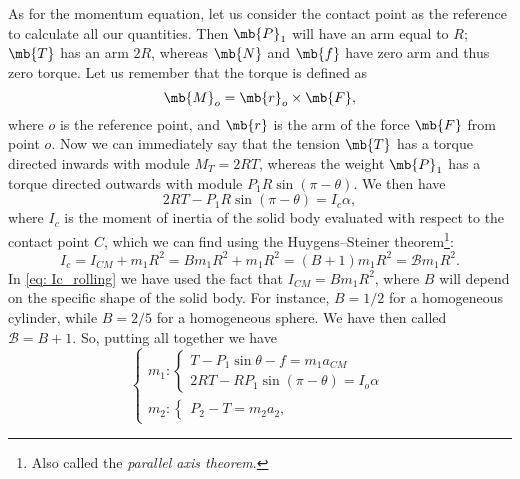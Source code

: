 \begin{description}
\begin{enumerate}[(a)]
        As for the momentum equation, let us consider the contact point as the reference to calculate all our quantities. Then $\mb{P}_1$ will have an arm equal to $R$; $\mb{T}$ has an arm $2R$, whereas $\mb{N}$ and $\mb{f}$ have zero arm and thus zero torque. Let us remember that the torque is defined as
        \begin{equation}
            \mb{M}_o = \mb{r}_o \times \mb{F},    
        \end{equation} 
        where $o$ is the reference point, and $\mb{r}$ is the arm of the force $\mb{F}$ from point $o$. Now we can immediately say that the tension $\mb{T}$ has a torque directed inwards with module $M_T = 2RT$, whereas the weight $\mb{P}_1$ has a torque directed outwards with module $P_1 R \sin (\pi - \theta)$.
        We then have
        \begin{equation}
            2RT - P_1 R \sin(\pi - \theta) = I_c \alpha,
        \end{equation}
        where $I_c$ is the moment of inertia of the solid body evaluated with respect to the contact point $C$, which we can find using the Huygens--Steiner theorem\footnote{Also called the \emph{parallel axis theorem}.}:
        \begin{equation}
            \label{eq: Ic_rolling}
            I_c = I_{CM} + m_1 R^2 = B m_1 R^2 + m_1 R^2 = (B+1) m_1 R^2 = \mathcal{B} m_1 R^2.
        \end{equation}
        In \cref{eq: Ic_rolling} we have used the fact that $I_{CM} = B m_1 R^2$, where $B$ will depend on the specific shape of the solid body. For instance, $B=1/2$ for a homogeneous cylinder, while $B=2/5$ for a homogeneous sphere. We have then called $\mathcal{B} = B+1$.
        So, putting all together we have
        \begin{equation}
            \label{eq: system_1}
            \begin{cases}
            m_1: 
            \begin{cases}
                T - P_1 \sin \theta - f = m_1 a_{CM} \\
                2RT - R P_1 \sin (\pi - \theta) = I_o \alpha
            \end{cases} \\
            m_2:
            \begin{cases}
                P_2 - T = m_2 a_2,
            \end{cases}
        \end{cases}
        \end{equation}

\end{enumerate}
\end{description}
